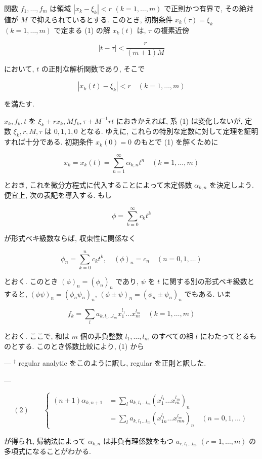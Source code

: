 \documentclass[dvipdfmx, leqno]{jsbook}
\begin{document}
関数 $f_1, \dots, f_m$ は領域 $|x_k - \xi_k| < r$ $(k=1,\dots,m)$ で正則かつ有界で, その絶対値が $M$ で抑えられているとする. このとき, 初期条件 $x_k(\tau) = \xi_k$ $(k=1,\dots,m)$ で定まる (1) の解 $x_k(t)$ は, $\tau$ の複素近傍

$$|t - \tau| < \frac{r}{(m+1)M}$$

において, $t$ の正則な解析関数であり, そこで

$$|x_k(t) - \xi_k| < r \quad (k=1,\dots,m)$$

を満たす.

$x_k, f_k, t$ を $\xi_k + rx_k, Mf_k, \tau + M^{-1}rt$ におきかえれば, 系 (1) は変化しないが, 定数 $\xi_k, r, M, \tau$ は $0, 1, 1, 0$ となる. ゆえに, これらの特別な定数に対して定理を証明すれば十分である. 初期条件 $x_k(0) = 0$ のもとで (1) を解くために

$$x_k = x_k(t) = \sum_{n=1}^{\infty} \alpha_{k,n} t^n \quad (k=1,\dots,m)$$

とおき, これを微分方程式に代入することによって未定係数 $\alpha_{k,n}$ を決定しよう. 便宜上, 次の表記を導入する. もし

$$\phi = \sum_{k=0}^{\infty} c_k t^k$$

が形式ベキ級数ならば, 収束性に関係なく

$$\phi_n = \sum_{k=0}^{n} c_k t^k, \quad (\phi)_n = c_n \quad (n=0,1,\dots)$$

とおく. このとき $(\phi)_n = (\phi_n)_n$ であり, $\psi$ を $t$ に関する別の形式ベキ級数とすると, $(\phi\psi)_n = (\phi_n \psi_n)_n, \, (\phi \pm \psi)_n = (\phi_n \pm \psi_n)_n$ でもある. いま

$$f_k = \sum_{l} a_{k, l_1 \dots l_m} x_1^{l_1} \dots x_m^{l_m} \quad (k=1,\dots,m)$$

とおく. ここで, 和は $m$ 個の非負整数 $l_1, \dots, l_m$ のすべての組 $l$ にわたってとるものとする. このとき係数比較により, (1) から

---
$^\dagger$ regular analytic をこのように訳し, regular を正則と訳した.

---

$$(2) \qquad \left\{ \begin{aligned} (n+1)\alpha_{k,n+1} &= \sum_{l} a_{k, l_1 \dots l_m} (x_1^{l_1} \dots x_m^{l_m})_n \\ &= \sum_{l} a_{k, l_1 \dots l_m} (x_{1n}^{l_1} \dots x_{mn}^{l_m})_n \quad (n=0,1,\dots) \end{aligned} \right.$$

が得られ, 帰納法によって $\alpha_{k,n}$ は非負有理係数をもつ $a_{r, l_1 \dots l_m}$ $(r=1,\dots,m)$ の多項式になることがわかる.
\end{document}
